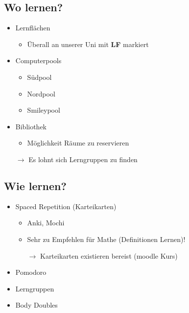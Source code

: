 \documentclass[
	aspectratio=169, 
	10pt 
]{beamer}
\begin{document}
\subsection{Wo lernen?}
\begin{frame}{\insertsubsection}
    \begin{itemize}
        \item Lernflächen \begin{itemize} \item Überall an unserer Uni mit \textbf{LF} markiert \end{itemize}
        \item Computerpools \begin{itemize}
            \item Südpool
            \item Nordpool
            \item Smileypool \end{itemize}
        \item Bibliothek \begin{itemize} \item Möglichkeit Räume zu reservieren \end{itemize}
        \item[$\rightarrow$] Es lohnt sich Lerngruppen zu finden 
    \end{itemize}
\end{frame}

\subsection{Wie lernen?}
\begin{frame}{\insertsubsection}
    \begin{itemize}
        \item Spaced Repetition (Karteikarten) \begin{itemize}
            \item Anki, Mochi
            \item Sehr zu Empfehlen für Mathe (Definitionen Lernen)! 
            \item[$\rightarrow$] Karteikarten existieren bereist (moodle Kurs) 
        \end{itemize}
        \item Pomodoro
        \item Lerngruppen
        \item Body Doubles 
    \end{itemize}
\end{frame}
\end{document}
